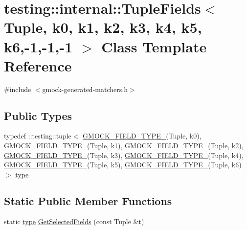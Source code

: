 \hypertarget{classtesting_1_1internal_1_1TupleFields_3_01Tuple_00_01k0_00_01k1_00_01k2_00_01k3_00_01k4_00_01k5_00_01k6_00-1_00-1_00-1_01_4}{}\section{testing\+:\+:internal\+:\+:Tuple\+Fields$<$ Tuple, k0, k1, k2, k3, k4, k5, k6,-\/1,-\/1,-\/1 $>$ Class Template Reference}
\label{classtesting_1_1internal_1_1TupleFields_3_01Tuple_00_01k0_00_01k1_00_01k2_00_01k3_00_01k4_00_01k5_00_01k6_00-1_00-1_00-1_01_4}


{\ttfamily \#include $<$gmock-\/generated-\/matchers.\+h$>$}

\subsection*{Public Types}
\begin{DoxyCompactItemize}
\item 
typedef \+::testing\+::tuple$<$ \hyperlink{gmock-generated-matchers_8h_acf3e27de83a73f0d873da1cd471e505b}{G\+M\+O\+C\+K\+\_\+\+F\+I\+E\+L\+D\+\_\+\+T\+Y\+P\+E\+\_\+}(Tuple, k0), \hyperlink{gmock-generated-matchers_8h_acf3e27de83a73f0d873da1cd471e505b}{G\+M\+O\+C\+K\+\_\+\+F\+I\+E\+L\+D\+\_\+\+T\+Y\+P\+E\+\_\+}(Tuple, k1), \hyperlink{gmock-generated-matchers_8h_acf3e27de83a73f0d873da1cd471e505b}{G\+M\+O\+C\+K\+\_\+\+F\+I\+E\+L\+D\+\_\+\+T\+Y\+P\+E\+\_\+}(Tuple, k2), \hyperlink{gmock-generated-matchers_8h_acf3e27de83a73f0d873da1cd471e505b}{G\+M\+O\+C\+K\+\_\+\+F\+I\+E\+L\+D\+\_\+\+T\+Y\+P\+E\+\_\+}(Tuple, k3), \hyperlink{gmock-generated-matchers_8h_acf3e27de83a73f0d873da1cd471e505b}{G\+M\+O\+C\+K\+\_\+\+F\+I\+E\+L\+D\+\_\+\+T\+Y\+P\+E\+\_\+}(Tuple, k4), \hyperlink{gmock-generated-matchers_8h_acf3e27de83a73f0d873da1cd471e505b}{G\+M\+O\+C\+K\+\_\+\+F\+I\+E\+L\+D\+\_\+\+T\+Y\+P\+E\+\_\+}(Tuple, k5), \hyperlink{gmock-generated-matchers_8h_acf3e27de83a73f0d873da1cd471e505b}{G\+M\+O\+C\+K\+\_\+\+F\+I\+E\+L\+D\+\_\+\+T\+Y\+P\+E\+\_\+}(Tuple, k6)$>$ \hyperlink{classtesting_1_1internal_1_1TupleFields_3_01Tuple_00_01k0_00_01k1_00_01k2_00_01k3_00_01k4_00_01k5_00_01k6_00-1_00-1_00-1_01_4_af88448437d5fc78f853662af70202380}{type}
\end{DoxyCompactItemize}
\subsection*{Static Public Member Functions}
\begin{DoxyCompactItemize}
\item 
static \hyperlink{classtesting_1_1internal_1_1TupleFields_3_01Tuple_00_01k0_00_01k1_00_01k2_00_01k3_00_01k4_00_01k5_00_01k6_00-1_00-1_00-1_01_4_af88448437d5fc78f853662af70202380}{type} \hyperlink{classtesting_1_1internal_1_1TupleFields_3_01Tuple_00_01k0_00_01k1_00_01k2_00_01k3_00_01k4_00_01k5_00_01k6_00-1_00-1_00-1_01_4_a8408461aa8107794d3abc85e2cb2721e}{Get\+Selected\+Fields} (const Tuple \&t)
\end{DoxyCompactItemize}


